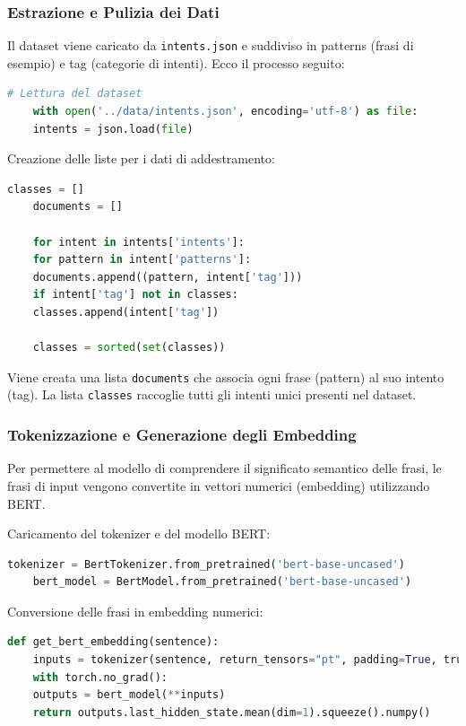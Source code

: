 \documentclass[12pt, letterpaper]{article}
\begin{document}
\subsubsection{Estrazione e Pulizia dei Dati}

Il dataset viene caricato da \texttt{intents.json} e suddiviso in patterns (frasi di esempio) e tag (categorie di intenti). Ecco il processo seguito:

\begin{lstlisting}[language=Python]
	# Lettura del dataset
	with open('../data/intents.json', encoding='utf-8') as file:
	intents = json.load(file)
\end{lstlisting}

Creazione delle liste per i dati di addestramento:

\begin{lstlisting}[language=Python]
	classes = []
	documents = []
	
	for intent in intents['intents']:
	for pattern in intent['patterns']:
	documents.append((pattern, intent['tag']))
	if intent['tag'] not in classes:
	classes.append(intent['tag'])
	
	classes = sorted(set(classes))
\end{lstlisting}

Viene creata una lista \texttt{documents} che associa ogni frase (pattern) al suo intento (tag). La lista \texttt{classes} raccoglie tutti gli intenti unici presenti nel dataset.

\subsubsection{Tokenizzazione e Generazione degli Embedding}

Per permettere al modello di comprendere il significato semantico delle frasi, le frasi di input vengono convertite in vettori numerici (embedding) utilizzando BERT.

Caricamento del tokenizer e del modello BERT:

\begin{lstlisting}[language=Python]
	tokenizer = BertTokenizer.from_pretrained('bert-base-uncased')
	bert_model = BertModel.from_pretrained('bert-base-uncased')
\end{lstlisting}

Conversione delle frasi in embedding numerici:

\begin{lstlisting}[language=Python]
	def get_bert_embedding(sentence):
	inputs = tokenizer(sentence, return_tensors="pt", padding=True, truncation=True, max_length=50)
	with torch.no_grad():
	outputs = bert_model(**inputs)
	return outputs.last_hidden_state.mean(dim=1).squeeze().numpy()
\end{lstlisting}
\end{document}
